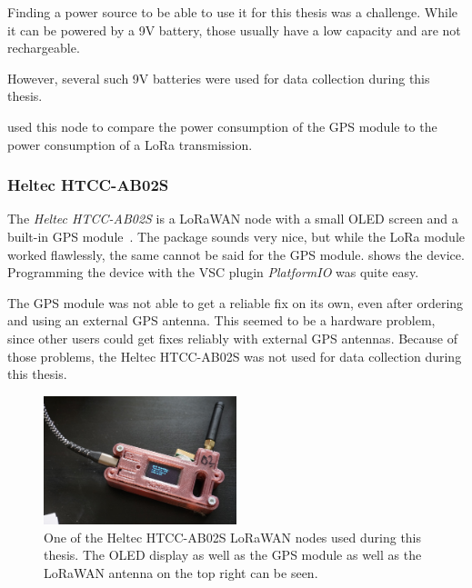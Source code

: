 Finding a power source to be able to use it for this thesis was a challenge.
While it can be powered by a 9V battery, those usually have a low capacity and are not rechargeable.

However, several such 9V batteries were used for data collection during this thesis.

 used this node to compare the power consumption of the \ac{GPS} module to the power consumption of a \ac{LoRa} transmission.

\subsubsection{Heltec HTCC-AB02S}\label{subsubsec:heltec-htcc-ab02s}

The \emph{Heltec HTCC-AB02S} is a \ac{LoRaWAN} node with a small OLED screen and a built-in \ac{GPS} module~\cite{heltec_automation_cubecell_2020}.
The package sounds very nice, but while the \ac{LoRa} module worked flawlessly, the same cannot be said for the \ac{GPS} module.
 shows the device.
Programming the device with the \ac{VSC} plugin \emph{PlatformIO} was quite easy.

The \ac{GPS} module was not able to get a reliable fix on its own, even after ordering and using an external GPS antenna.
This seemed to be a hardware problem, since other users could get fixes reliably with external \ac{GPS} antennas.
Because of those problems, the Heltec HTCC-AB02S was not used for data collection during this thesis.

\begin{figure}[htbp]
    \centering
    \includegraphics[width=0.5\textwidth]{pictures/hardware/gps-nodes/HTCC-AB02S.jpg}
    \caption{
        One of the Heltec HTCC-AB02S \ac{LoRaWAN} nodes used during this thesis.
        The \ac{OLED} display as well as the \ac{GPS} module as well as the \ac{LoRaWAN} antenna on the top right can be seen.
    }\label{pic:heltec-htcc-ab02s}
\end{figure}

